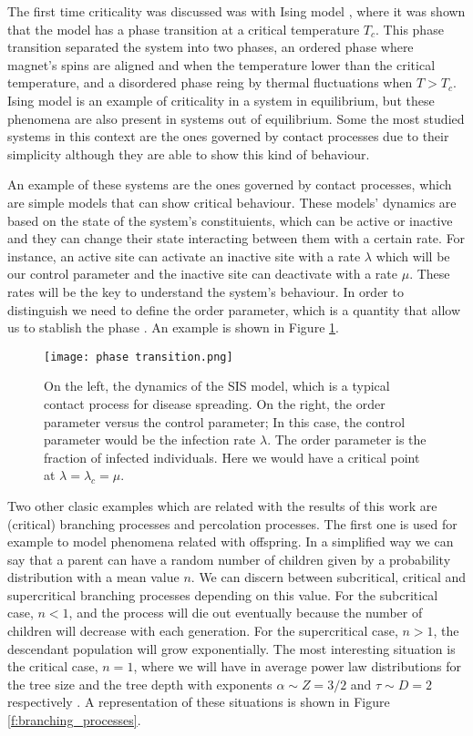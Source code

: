 The first time criticality was discussed was with Ising model \cite{ising1925}, where it was shown that the model has a phase transition at a critical temperature $T_c$. This phase transition
separated the system into two phases, an ordered phase where magnet's spins are aligned and when the temperature lower than the critical temperature, and a disordered phase 
reing by thermal fluctuations when $T>T_c$. Ising model is an example of criticality in a system in equilibrium, but these phenomena are also present in systems out of equilibrium. 
Some the most studied systems in this context are the ones governed by contact processes due to their simplicity although they are able to show this kind of behaviour.

An example of these systems are the ones governed by contact processes, which are simple models that can show critical behaviour. These models' dynamics are based on the state of 
the system's constituients, which can be active or inactive and they can change their state interacting between them with a certain rate. For instance, an active site can activate
an inactive site with a rate $\lambda$ which will be our control parameter and the inactive site can deactivate with a rate $\mu$. 
These rates will be the key to understand the system's behaviour. In order to distinguish we need to define the order parameter, which is a quantity that allow us to stablish 
the phase \cite{wilting201925}. An example is shown in Figure \ref{f:order_parameter}.

\begin{figure}[H]
    \centering
    \texttt{[image: phase transition.png]}
    \caption{On the left, the dynamics of the SIS model, which is a typical contact process for disease spreading. On the right, the order parameter versus the control parameter; In this 
    case, the control parameter would be the infection rate $\lambda$. The order parameter is the fraction of infected individuals. Here we would have a critical point at $\lambda=\lambda_c
    =\mu$.}
    \label{f:order_parameter}
\end{figure}

Two other clasic examples  which are related with the results of this work are (critical) branching processes and percolation processes. The first one is used for example to model phenomena 
related with offspring. In a simplified way we can say that a parent can have a random number of children given by a probability distribution with a mean value $n$. We can discern between
subcritical, critical and supercritical branching processes depending on this value. For the subcritical case, $n<1$, and the process will die out eventually because the number of children
will decrease with each generation. For the supercritical case, $n>1$, the descendant population will grow exponentially. The most interesting situation is the critical case, $n=1$, where 
we will have in average power law distributions for the tree size and the tree depth with exponents $\alpha\sim Z=3/2$ and $\tau\sim D=2$ respectively \cite{notarmuzi2021percolation}. A 
representation of these situations is shown in Figure \ref{f:branching_processes}.

